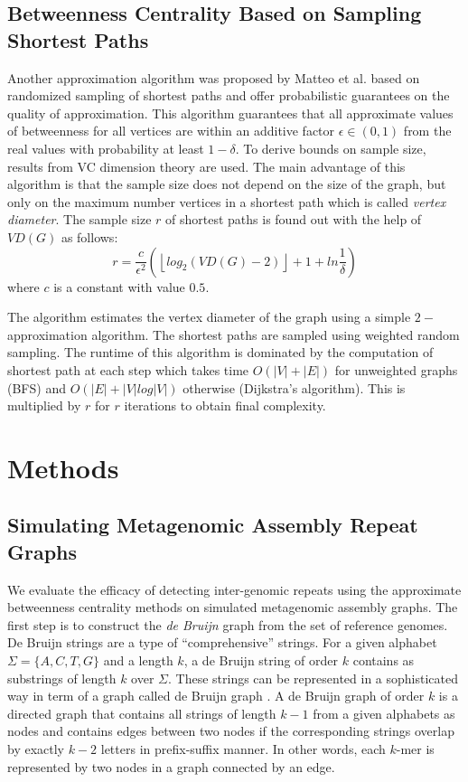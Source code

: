 \documentclass[runningheads,a4paper]{llncs}
\begin{document}
\subsection*{Betweenness Centrality Based on Sampling Shortest Paths}
Another approximation algorithm was proposed by Matteo et al. \cite{matteo} based on randomized sampling of shortest paths and offer probabilistic guarantees on the quality of approximation. This algorithm guarantees that all approximate values of betweenness for all vertices are within an additive factor $\epsilon \in (0,1)$ from the real values with probability at least $1-\delta$. To derive bounds on sample size, results from VC dimension theory\cite{vc} are used. The main advantage of this algorithm is that the sample size does not depend on the size of the graph, but only on the maximum number vertices in a shortest path which is called \textit{vertex diameter}. The sample size $r$ of shortest paths is found out with the help of $VD(G)$ as follows:
\begin{equation} \label{sample_size_algo}
r = \frac{c}{\epsilon^{2}}(\left\lfloor{log_{2}(VD(G) - 2)}\right\rfloor + 1 + ln\frac{1}{\delta})
\end{equation} 
where $c$ is a constant with value $0.5$. 

The algorithm estimates the vertex diameter of the graph using a simple $2-$approximation algorithm. The shortest paths are sampled using weighted random sampling. The runtime of this algorithm is dominated by the computation of shortest path at each step which takes time $O(|V| + |E|)$ for unweighted graphs (BFS) and $O(|E| + |V|log|V|)$ otherwise (Dijkstra's algorithm). This is multiplied by $r$ for $r$ iterations to obtain final complexity.


\section{Methods}


\subsection*{Simulating Metagenomic Assembly Repeat Graphs}

We evaluate the efficacy of detecting inter-genomic repeats using the approximate betweenness centrality methods on simulated metagenomic assembly graphs.
The first step is to construct the \textit{de Bruijn} graph from the set of reference genomes.
De Bruijn strings are a type of ``comprehensive'' strings. For a given alphabet $\Sigma = \{A,C,T,G\}$ and a length $k$, a de Bruijn string of order $k$ contains as substrings of length $k$ over $\Sigma$. These strings can be represented in a sophisticated way in term of a graph called de Bruijn graph \cite{debruijn}. A de Bruijn graph of order $k$ is a directed graph that contains all strings of length $k-1$ from a given alphabets as nodes and contains edges between two nodes if the corresponding strings overlap by exactly $k-2$ letters in prefix-suffix manner. In other words, each $k$-mer is represented by two nodes in a graph connected by an edge. 
\end{document}
